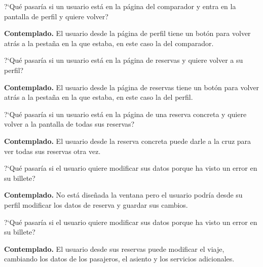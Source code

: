 \begin{escenario}
    \centering
    ?`Qué pasaría si un usuario está en la página del comparador y entra en la pantalla de perfil y quiere volver?

    \begin{solucion}
        \centering
        \textbf{Contemplado.} El usuario desde la página de perfil tiene un botón para volver atrás a la pestaña en la que estaba, en este caso la del comparador.
    \end{solucion}
\end{escenario}

\begin{escenario}
    \centering
    ?`Qué pasaría si un usuario está en la página de reservas y quiere volver a su perfil?

    \begin{solucion}
        \centering
        \textbf{Contemplado.} El usuario desde la página de reservas tiene un botón para volver atrás a la pestaña en la que estaba, en este caso la del perfil.
    \end{solucion}
\end{escenario}

\begin{escenario}
    \centering
    ?`Qué pasaría si un usuario está en la página de una reserva concreta y quiere volver a la pantalla de todas sus reservas?

    \begin{solucion}
        \centering
        \textbf{Contemplado.} El usuario desde la reserva concreta puede darle a la cruz para ver todas sus reservas otra vez.
    \end{solucion}
\end{escenario}

\begin{escenario}
    \centering
    ?`Qué pasaría si el usuario quiere modificar sus datos porque ha visto un error en su billete?

    \begin{solucion}
        \centering
        \textbf{Contemplado.} No está diseñada la ventana pero el usuario podría desde su perfil modificar los datos de reserva y guardar sus cambios.
    \end{solucion}
\end{escenario}

\begin{escenario}
    \centering
    ?`Qué pasaría si el usuario quiere modificar sus datos porque ha visto un error en su billete?

    \begin{solucion}
        \centering
        \textbf{Contemplado.} El usuario desde sus reservas puede modificar el viaje, cambiando los datos de los pasajeros, el asiento y los servicios adicionales.
    \end{solucion}
\end{escenario}

